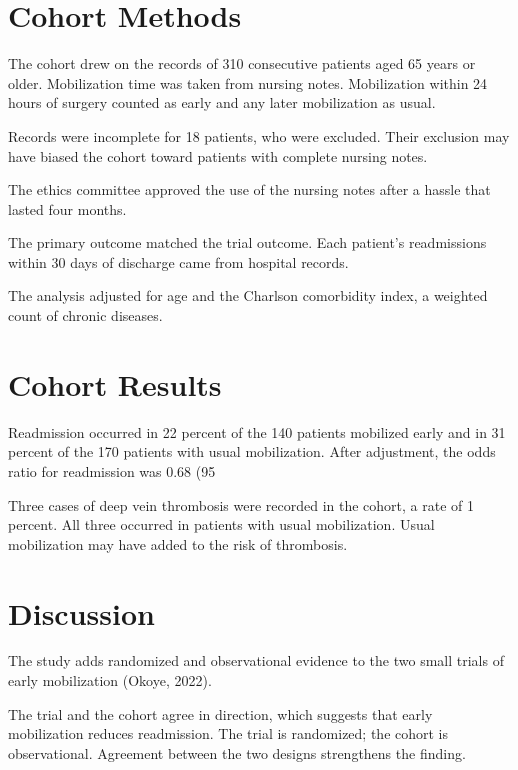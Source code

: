 \section{Cohort Methods}

The cohort drew on the records of 310 consecutive patients aged 65 years or older. Mobilization time was taken from nursing notes. Mobilization within 24 hours of surgery counted as early and any later mobilization as usual.

Records were incomplete for 18 patients, who were excluded. Their exclusion may have biased the cohort toward patients with complete nursing notes.

The ethics committee approved the use of the nursing notes after a hassle that lasted four months.

The primary outcome matched the trial outcome. Each patient's readmissions within 30 days of discharge came from hospital records.

The analysis adjusted for age and the Charlson comorbidity index, a weighted count of chronic diseases.

\section{Cohort Results}

Readmission occurred in 22 percent of the 140 patients mobilized early and in 31 percent of the 170 patients with usual mobilization. After adjustment, the odds ratio for readmission was 0.68 (95%

Three cases of deep vein thrombosis were recorded in the cohort, a rate of 1 percent. All three occurred in patients with usual mobilization. Usual mobilization may have added to the risk of thrombosis.

\section{Discussion}

The study adds randomized and observational evidence to the two small trials of early mobilization (Okoye, 2022).

The trial and the cohort agree in direction, which suggests that early mobilization reduces readmission. The trial is randomized; the cohort is observational. Agreement between the two designs strengthens the finding.

